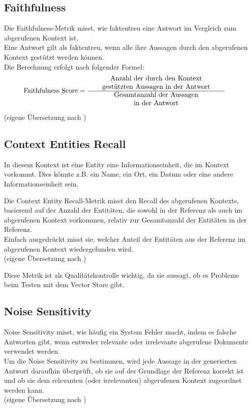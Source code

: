 \subsection{Faithfulness}
\begin{plainquote}
Die Faithfulness-Metrik misst, wie faktentreu eine Antwort im Vergleich zum abgerufenen Kontext ist.\\

Eine Antwort gilt als faktentreu, wenn alle ihre Aussagen durch den abgerufenen Kontext gestützt werden können.\\

Die Berechnung erfolgt nach folgender Formel:
\begin{align}
  \text{Faithfulness Score}
    &= \frac{
        \parbox{7cm}{\centering Anzahl der durch den Kontext\\ gestützten Aussagen in der Antwort}
      }{
        \parbox{7cm}{\centering Gesamtanzahl der Aussagen\\ in der Antwort}
      }
  \end{align}

(eigene Übersetzung nach \cite{ragas_faithfulness})
\end{plainquote}

\subsection{Context Entities Recall}
In diesem Kontext ist eine Entity eine Informationseinheit, die im Kontext vorkommt.
Dies könnte z.B. ein Name, ein Ort, ein Datum oder eine andere Informationseinheit sein.

\begin{plainquote}
Die Context Entity Recall-Metrik misst den Recall des abgerufenen Kontexts, basierend auf der Anzahl der Entitäten, die sowohl in der Referenz als auch im abgerufenen Kontext vorkommen, relativ zur Gesamtanzahl der Entitäten in der Referenz.\\
Einfach ausgedrückt misst sie, welcher Anteil der Entitäten aus der Referenz im abgerufenen Kontext wiedergefunden wird.\\
(eigene Übersetzung nach \cite{ragas_context_entities_recall})
\end{plainquote}
Diese Metrik ist als Qualitätskontrolle wichtig, da sie aussagt, ob es Probleme beim Testen mit dem Vector Store gibt.

\subsection{Noise Sensitivity}
\begin{plainquote}
Noise Sensitivity misst, wie häufig ein System Fehler macht, indem es falsche Antworten gibt, wenn entweder relevante oder irrelevante abgerufene Dokumente verwendet werden.\\
Um die Noise Sensitivity zu bestimmen, wird jede Aussage in der generierten Antwort daraufhin überprüft, ob sie auf der Grundlage der Referenz korrekt ist und ob sie dem relevanten (oder irrelevanten) abgerufenen Kontext zugeordnet werden kann.\\
(eigene Übersetzung nach \cite{ragas_noise_sensitivity})
\end{plainquote}

